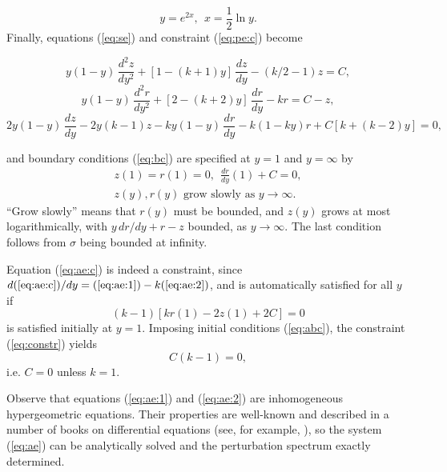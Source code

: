 \begin{equation} \label{eq:y}
  y = e^{2x}, \ \ 
  x = \frac{1}{2} \ln y.
\end{equation}
Finally, equations (\ref{eq:se}) and constraint (\ref{eq:pe:c}) become
\begin{mathletters} \label{eq:ae}
\begin{equation} \label{eq:ae:1}
  y(1-y)\, \frac{d^2z}{dy^2} + [1 - (k+1)y]\, \frac{dz}{dy} - (k/2 - 1) z = C,
\end{equation}
\begin{equation} \label{eq:ae:2}
  y(1-y)\, \frac{d^2r}{dy^2} + [2 - (k+2)y]\, \frac{dr}{dy} - k r = C - z,
\end{equation}
\begin{equation} \label{eq:ae:c}
  2 y(1-y)\, \frac{dz}{dy} - 2 y(k-1) z
    - k y(1-y)\, \frac{dr}{dy} - k(1-ky) r + C [k + (k-2)y] = 0,
\end{equation}
\end{mathletters}
and boundary conditions (\ref{eq:bc}) are specified at $y=1$ and
$y=\infty$ by
\begin{eqnarray} \label{eq:abc}
  z(1)=r(1)=0,\ \ \frac{dr}{dy}(1) + C = 0, \nonumber\\
  z(y), r(y) \text{ grow slowly as } y \rightarrow \infty.
\end{eqnarray}
``Grow slowly'' means that $r(y)$ must be bounded, and $z(y)$ grows
at most logarithmically, with $y\, dr/dy + r - z$ bounded, as
$y \rightarrow \infty$. The last condition follows from $\sigma$ being
bounded at infinity.

Equation (\ref{eq:ae:c}) is indeed a constraint, since
$d(\ref{eq:ae:c})/dy = (\ref{eq:ae:1}) - k (\ref{eq:ae:2})$,
and is automatically satisfied for all $y$ if
\begin{equation} \label{eq:constr}
  (k-1) [k r(1) - 2 z(1) + 2 C] = 0
\end{equation}
is satisfied initially at $y = 1$. Imposing initial conditions
(\ref{eq:abc}), the constraint (\ref{eq:constr}) yields
\begin{equation} \label{eq:ck}
  C(k-1)=0,
\end{equation}
i.e. $C=0$ unless $k=1$.

Observe that equations (\ref{eq:ae:1}) and (\ref{eq:ae:2}) are
inhomogeneous hypergeometric equations. Their properties are well-known
and described in a number of books on differential equations (see, for
example, \cite{Erdelyi:53}), so the system (\ref{eq:ae}) can be
analytically solved and the perturbation spectrum exactly determined.

